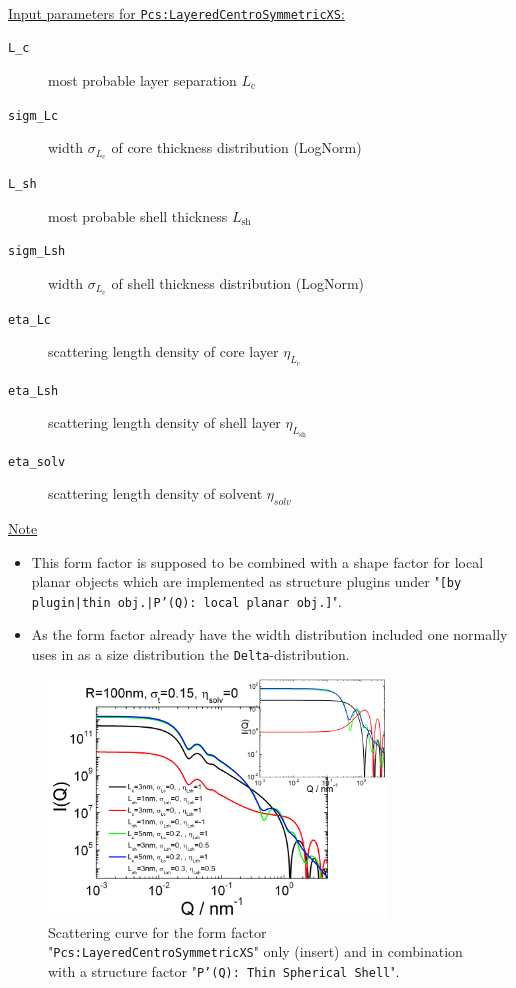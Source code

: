 \vspace{5mm}

\hspace{1pt}\\
\uline{Input parameters for \texttt{Pcs:LayeredCentroSymmetricXS}:}
\begin{description}
    \item[\texttt{L\_c}] most probable layer separation $L_\textrm{c}$
    \item[\texttt{sigm\_Lc}] width $\sigma_{L_\textrm{c}}$ of core thickness distribution (LogNorm)
    \item[\texttt{L\_sh}] most probable shell thickness $L_\textrm{sh}$
    \item[\texttt{sigm\_Lsh}] width $\sigma_{L_\textrm{c}}$ of shell thickness distribution (LogNorm)
    \item[\texttt{eta\_Lc}] scattering length density of core layer $\eta_{L_\textrm{c}}$
    \item[\texttt{eta\_Lsh}] scattering length density of shell layer $\eta_{L_\textrm{sh}}$
    \item[\texttt{eta\_solv}] scattering length density of solvent $\eta_{solv}$
\end{description}

\noindent
\uline{Note}
\begin{itemize}
  \item This form factor is supposed to be combined with a shape factor for
local planar objects which are implemented as structure  plugins
under "\texttt{[by plugin|thin obj.|P'(Q): local planar
obj.]}".
\item As the form factor already have the width distribution included one normally uses in \SASfit as a size distribution
the \texttt{Delta}-distribution.
\end{itemize}

\begin{figure}[htb]
\begin{center}
\includegraphics[width=0.8\textwidth,height=0.55\textwidth]{../images/form_factor/anisotropic/Pcs_planar2centrosymmIQ.png}
\end{center}
\caption{Scattering curve for the form factor "\texttt{Pcs:LayeredCentroSymmetricXS}" only (insert) and
in combination with a structure factor "\texttt{P'(Q): Thin Spherical Shell}".}
\label{fig:Pcs_planar2centrosymmIQ}
\end{figure}

